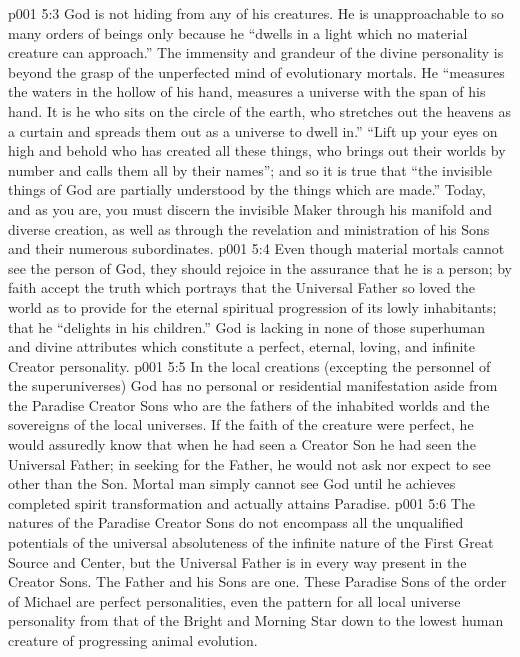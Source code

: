 \vs p001 5:3 God is not hiding from any of his creatures. He is unapproachable to so many orders of beings only because he “dwells in a light which no material creature can approach.” The immensity and grandeur of the divine personality is beyond the grasp of the unperfected mind of evolutionary mortals. He “measures the waters in the hollow of his hand, measures a universe with the span of his hand. It is he who sits on the circle of the earth, who stretches out the heavens as a curtain and spreads them out as a universe to dwell in.” “Lift up your eyes on high and behold who has created all these things, who brings out their worlds by number and calls them all by their names”; and so it is true that “the invisible things of God are partially understood by the things which are made.” Today, and as you are, you must discern the invisible Maker through his manifold and diverse creation, as well as through the revelation and ministration of his Sons and their numerous subordinates.
\vs p001 5:4 Even though material mortals cannot see the person of God, they should rejoice in the assurance that he is a person; by faith accept the truth which portrays that the Universal Father so loved the world as to provide for the eternal spiritual progression of its lowly inhabitants; that he “delights in his children.” God is lacking in none of those superhuman and divine attributes which constitute a perfect, eternal, loving, and infinite Creator personality.
\pc \vs p001 5:5 In the local creations (excepting the personnel of the superuniverses) God has no personal or residential manifestation aside from the Paradise Creator Sons who are the fathers of the inhabited worlds and the sovereigns of the local universes. If the faith of the creature were perfect, he would assuredly know that when he had seen a Creator Son he had seen the Universal Father; in seeking for the Father, he would not ask nor expect to see other than the Son. Mortal man simply cannot see God until he achieves completed spirit transformation and actually attains Paradise.
\vs p001 5:6 The natures of the Paradise Creator Sons do not encompass all the unqualified potentials of the universal absoluteness of the infinite nature of the First Great Source and Center, but the Universal Father is in every way  present in the Creator Sons. The Father and his Sons are one. These Paradise Sons of the order of Michael are perfect personalities, even the pattern for all local universe personality from that of the Bright and Morning Star down to the lowest human creature of progressing animal evolution.
